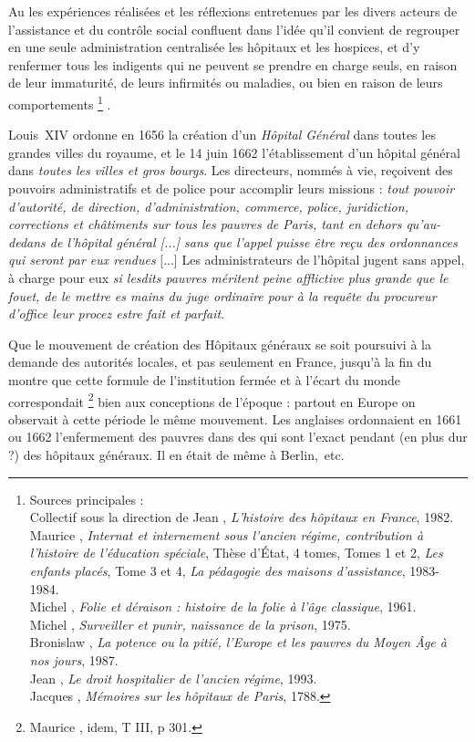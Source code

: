  Au  les expériences réalisées et les réflexions entretenues par les divers acteurs de l'assistance et du contrôle social confluent dans l'idée qu'il convient de regrouper en une seule administration centralisée les hôpitaux et les hospices, et d'y renfermer tous les indigents qui ne peuvent se prendre en charge seuls, en raison de leur immaturité, de leurs infirmités ou maladies, ou bien en raison de leurs comportements%
\footnote{Sources principales :
\\Collectif sous la direction de Jean , \emph{L'histoire des hôpitaux en France}, 1982.
\\Maurice {}, \emph{Internat et internement sous l'ancien régime, contribution à l'histoire de l'éducation spéciale}, Thèse d'État, 4 tomes, Tomes 1 et 2, \emph{Les enfants placés}, Tome 3 et 4, \emph{La pédagogie des maisons d'assistance}, 1983-1984.
\\Michel {}, \emph{Folie et déraison : histoire de la folie à l'âge classique}, 1961.
\\Michel {}, \emph{Surveiller et punir, naissance de la prison}, 1975.
\\Bronislaw {}, \emph{La potence ou la pitié, l'Europe et les pauvres du Moyen Âge à nos jours}, 1987.
\\Jean {}, \emph{Le droit hospitalier de l'ancien régime}, 1993.
\\Jacques {}, \emph{Mémoires sur les hôpitaux de Paris}, 1788.}%
. 

 Louis~XIV ordonne en 1656 la création d'un \emph{Hôpital Général} dans toutes les grandes villes du royaume, et le 14 juin 1662 l'établissement d'un hôpital général dans \emph{toutes les villes et gros bourgs}. Les directeurs, nommés à vie, reçoivent des pouvoirs administratifs et de police pour accomplir leurs missions : \emph{tout pouvoir d'autorité, de direction, d'administration, commerce, police, juridiction, corrections et châtiments sur tous les pauvres de Paris, tant en dehors qu'au-dedans de l'hôpital général \emph{[...]} sans que l'appel puisse être reçu des ordonnances qui seront par eux rendues} [...] Les administrateurs de l'hôpital jugent sans appel, à charge pour eux \emph{si lesdits pauvres méritent peine afflictive plus grande que le fouet, de le mettre es mains du juge ordinaire pour à la requête du procureur d'office leur procez estre fait et parfait}. 

 Que le mouvement de création des Hôpitaux généraux se soit poursuivi à la demande des autorités locales, et pas seulement en France, jusqu'à la fin du  montre que cette formule de l'institution fermée et à l'écart du monde correspondait%
\footnote{Maurice , idem, T III, p 301.} 
bien aux conceptions de l'époque : partout en Europe on observait à cette période le même mouvement. Les  anglaises ordonnaient en 1661 ou 1662 l'enfermement des pauvres dans des  qui sont l'exact pendant (en plus dur ?) des hôpitaux généraux. Il en était de même à Berlin,~etc.

